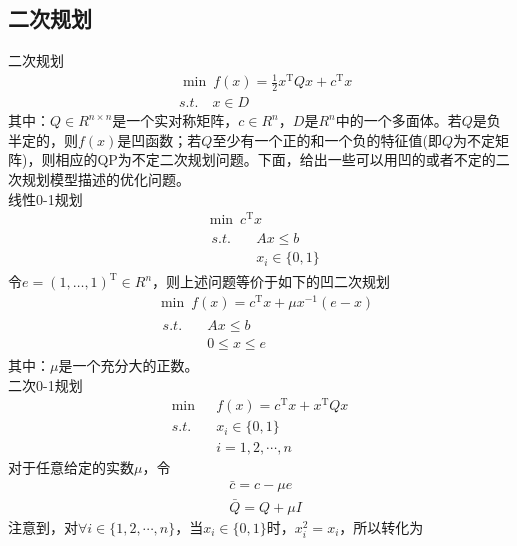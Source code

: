     \subsection{二次规划}
        \par
        二次规划
        \begin{align*}
        &\mathop {\min}\ f(x)=\frac 12 x^\mathrm{T} Qx+ c^\mathrm{T} x\\
        &s.t.\quad x \in D
        \end{align*}
        其中：$Q\in R^{n \times n}$是一个实对称矩阵，$c\in R^n$，$D$是$R^n$中的一个多面体。若$Q$是负半定的，则$f(x)$是凹函数；若$Q$至少有一个正的和一个负的特征值(即$Q$为不定矩阵)，则相应的QP为不定二次规划问题。下面，给出一些可以用凹的或者不定的二次规划模型描述的优化问题。\\
        线性0-1规划
        \begin{align*}
        &\mathop {\min}\  c^\mathrm{T} x\\
        &\begin{aligned}
        s.t.\quad & Ax \leqslant b\\
        \qquad &x_i\in \{0,1\}
        \end{aligned}
        \end{align*}
        令$e=(1,\ldots,1)^\mathrm{T} \in R^n$，则上述问题等价于如下的凹二次规划
        \begin{align*}
       &\mathop {\min}\  f(x)=c^\mathrm{T} x+\mu x^{-1}(e-x)\\
       &\begin{aligned}
       s.t.\quad &Ax \leqslant b\\
       & 0\leqslant x\leqslant e
       \end{aligned}
        \end{align*}
        其中：$\mu$是一个充分大的正数。\\
        二次0-1规划
        \begin{align*}
       \mathop {\min}\  &f(x)=c^\mathrm{T} x+ x^\mathrm{T} Qx\\
       s.t.\quad& x_i\in \{0,1\}\\
       \qquad &i=1,2,\cdots,n
        \end{align*}
        对于任意给定的实数$\mu$，令
        \begin{align*}
       &\bar{c}=c-\mu e\\
       &\bar{Q}=Q+\mu I
        \end{align*}
        注意到，对$\forall i \in \{1,2,\cdots,n\}$，当$x_i\in \{0,1\}$时，$x_i^2=x_i$，所以转化为
